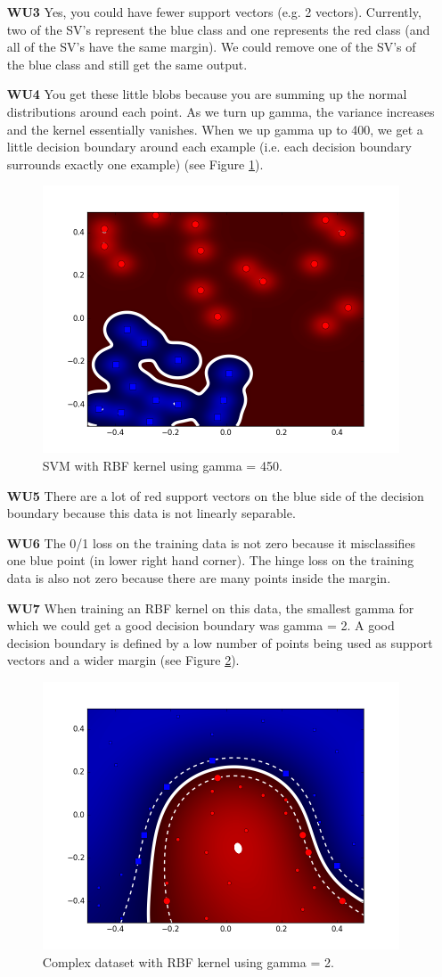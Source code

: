 \documentclass{article}
\begin{document}
\begin{enumerate}
	\FloatBarrier
	
	\item[\textbf{WU3}] 
Yes, you could have fewer support vectors (e.g. 2 vectors). Currently, two of the SV's represent the blue class and one represents the red class (and all of the SV's have the same margin). We could remove one of the SV's of the blue class and still get the same output. 

	\item[\textbf{WU4}]
You get these little blobs because you are summing up the normal distributions around each point. As we turn up gamma, the variance increases and the kernel essentially vanishes. When we up gamma up to 400, we get a little decision boundary around each example (i.e. each decision boundary surrounds exactly one example) (see Figure \ref{fig:WU4}).

\begin{figure}[htp]
\centering
\includegraphics[width=.5\textwidth]{wu4.png}
\caption{SVM with RBF kernel using gamma = 450.}
\label{fig:WU4}
\end{figure}

	\item[\textbf{WU5}]
There are a lot of red support vectors on the blue side of the decision boundary because this data is not linearly separable. 

	\item[\textbf{WU6}]
The 0/1 loss on the training data is not zero because it misclassifies one blue point (in lower right hand corner). The hinge loss on the training data is also not zero because there are many points inside the margin.

	\item[\textbf{WU7}]
When training an RBF kernel on this data, the smallest gamma for which we could get a good decision boundary was gamma = 2. A good decision boundary is defined by a low number of points being used as support vectors and a wider margin (see Figure \ref{fig:WU7}). 

\begin{figure}[htp]
\centering
\includegraphics[width=.5\textwidth]{wu7.png}
\caption{Complex dataset with RBF kernel using gamma = 2.}
\label{fig:WU7}
\end{figure}

\pagebreak

\end{enumerate}
\end{document}
